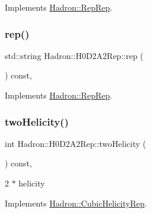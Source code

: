 Implements \mbox{\hyperlink{structHadron_1_1RepRep_ab3213025f6de249f7095892109575fde}{Hadron\+::\+Rep\+Rep}}.

\mbox{\label{structHadron_1_1H0D2A2Rep_ae0f8b84aedb60c30e04ff9aa344142a6}} 
\subsubsection{\texorpdfstring{rep()}{rep()}\hspace{0.1cm}{\footnotesize\ttfamily [5/5]}}
{\footnotesize\ttfamily std\+::string Hadron\+::\+H0\+D2\+A2\+Rep\+::rep (\begin{DoxyParamCaption}{ }\end{DoxyParamCaption}) const\hspace{0.3cm}{\ttfamily [inline]}, {\ttfamily [virtual]}}



Implements \mbox{\hyperlink{structHadron_1_1RepRep_ab3213025f6de249f7095892109575fde}{Hadron\+::\+Rep\+Rep}}.

\mbox{\label{structHadron_1_1H0D2A2Rep_ac561e7d1621438c3f64d1d13a2f62098}} 
\subsubsection{\texorpdfstring{twoHelicity()}{twoHelicity()}\hspace{0.1cm}{\footnotesize\ttfamily [1/3]}}
{\footnotesize\ttfamily int Hadron\+::\+H0\+D2\+A2\+Rep\+::two\+Helicity (\begin{DoxyParamCaption}{ }\end{DoxyParamCaption}) const\hspace{0.3cm}{\ttfamily [inline]}, {\ttfamily [virtual]}}

2 $\ast$ helicity 

Implements \mbox{\hyperlink{structHadron_1_1CubicHelicityRep_af507aa56fc2747eacc8cb6c96db31ecc}{Hadron\+::\+Cubic\+Helicity\+Rep}}.

\mbox{\label{structHadron_1_1H0D2A2Rep_ac561e7d1621438c3f64d1d13a2f62098}} 

